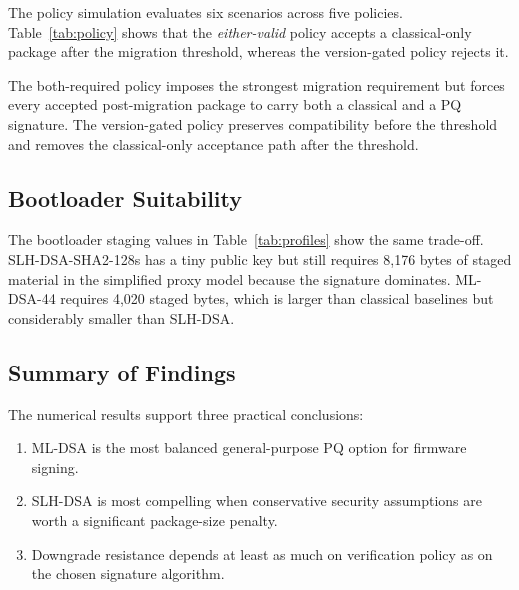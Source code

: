 The policy simulation evaluates six scenarios across five policies. Table~\ref{tab:policy} shows that the \textit{either-valid} policy accepts a classical-only package after the migration threshold, whereas the version-gated policy rejects it.

\begin{table}[H]
\caption{Policy Simulation Outcomes (\textbf{A} = Accept, \textbf{R} = Reject)}
\label{tab:policy}
\centering
\scriptsize
\setlength{\tabcolsep}{2.5pt}
\end{table}

The both-required policy imposes the strongest migration requirement but forces every accepted post-migration package to carry both a classical and a PQ signature. The version-gated policy preserves compatibility before the threshold and removes the classical-only acceptance path after the threshold.

\subsection{Bootloader Suitability}

The bootloader staging values in Table~\ref{tab:profiles} show the same trade-off. SLH-DSA-SHA2-128s has a tiny public key but still requires 8,176 bytes of staged material in the simplified proxy model because the signature dominates. ML-DSA-44 requires 4,020 staged bytes, which is larger than classical baselines but considerably smaller than SLH-DSA.

\subsection{Summary of Findings}

The numerical results support three practical conclusions:
\begin{enumerate}
\item ML-DSA is the most balanced general-purpose PQ option for firmware signing.
\item SLH-DSA is most compelling when conservative security assumptions are worth a significant package-size penalty.
\item Downgrade resistance depends at least as much on verification policy as on the chosen signature algorithm.
\end{enumerate}
